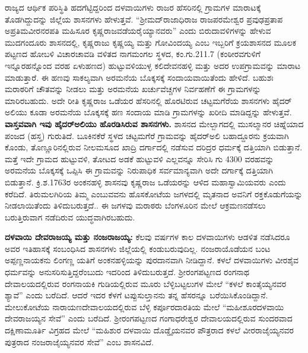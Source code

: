 ರಾಜ್ಯದ ಆರ್ಥಿಕ ಪರಿಸ್ಥಿತಿ ಹದಗೆಟ್ಟಿದ್ದರಿಂದ ದಳವಾಯಿಗಳು ರಾಜರ ಹೆಸರಿನಲ್ಲಿ ಗ್ರಾಮಗಳ ಮಾರಾಟಕ್ಕೆ ತೊಡಗಿದ್ದುದನ್ನು ಜಿಲ್ಲೆಯ ಶಾಸನಗಳು ಹೇಳುತ್ತವೆ. “ಶ‍್ರೀಮದ್​ರಾಜಾಧಿರಾಜ ರಾಜಪರಮೇಶ್ವರ ಪ್ರವುಢಪ್ರತಾಪ ಅಪ್ರತಿಮವೀರನರಪತಿ ಮಹಿಸೂರ ಕೃಷ್ಣರಾಜವಡೆಯರೈಯ್ಯಾನವರು” ಎಂದು ಬಿರುದಾವಳಿಗಳನ್ನು ಹೇಳುವ ಮುದಗಂದೂರು ಶಾಸನದಲ್ಲಿ, ಕೃಷ್ಣರಾಜು ಕೃಷ್ಣಯ್ಯ ಮತ್ತು ಗೋವಿಂದಯ್ಯ ಎಂಬ ಇಬ್ಬರಿಗೆ ಕ್ರಯಶಾಸನದ ಮೂಲಕ ಪಟ್ಟಣದ ಹೋಬಳಿ ವಿಚಾರಚಾವಡಿ ವಳಿತದ ನಾಗಮಂಗಲ ಸ್ಥಳದ, ಕಂ.ಗು.211.7 (ಕಂಠೀರವಗುಳಿಗೆ ಇನ್ನೂರಹನ್ನೊಂದ ವರಹ ಏಳುಹಣದ) ಹುಟ್ಟುವಳಿಯುಳ್ಳ ಕಲಿದೇವನಹಳ್ಳಿ ಮತ್ತು ಅದರ ಉಪಗ್ರಾಮವನ್ನು ಮಾರಾಟ ಮಾಡುತ್ತಾರೆ. ಈ ಹಣವು ಸಾಕಲ್ಯವಾಗಿ ಅರಮನೆಯ ಬೊಕ್ಕಸಕ್ಕೆ ಸಂದಾಯವಾಯಿತೆಂದು ಹೇಳಿದೆ. ಬಹುಶಃ ಮರಾಠರಿಗೆ ಚೌತವನ್ನು ನೀಡಲು ಮತ್ತು ಅರಮನೆಯ ಖರ್ಚುವೆಚ್ಚಗಳ ನಿರ್ವಹಣೆಗೆ ಈ ಗ್ರಾಮಗಳನ್ನು ಮಾರಿರಬಹುದು. ಅದೇ ರೀತಿ ಕೃಷ್ಣರಾಜ ಒಡೆಯರ ಹೆಸರಿನಲ್ಲಿ ಹೊರಟಿರುವ ಚಟ್ಟಮಗೆರೆಯ ಶಾಸನಗಳು ಹೈದರ್​ಅಲಿಯು ಕೂಡಾ ಅರಮನೆಯ ಬೊಕ್ಕಸಕ್ಕೆ ಹಣ ಸಂದಾಯ ಮಾಡಿ ಗ್ರಾಮಗಳನ್ನು ಖರೀದಿ ಮಾಡಿದ್ದನ್ನು ಹೇಳುತ್ತವೆ. \textbf{ವಾಸ್ತವವಾಗಿ ಇವು ಹೈದರ್​ಅಲಿಯು ಹೊರಡಿಸಿರುವ ಶಾಸನಗಳು.} ಶಾಸನದ ಮೇಲ್ಬಾಗದಲ್ಲಿ ಮುಸಲ್ಮಾನರ ಚಿಹ್ನೆಯಾದ ಪಂಜದ (ಹಸ್ತ) ಗುರುತಿದೆ. ಬೂಕಿನಕೆರೆ ಸ್ಥಳದ ಚಟ್ಟಮಗೆರೆ ಗ್ರಾಮವನ್ನು ಹೈದರ್​ಅಲಿ ಬಹಾದ್ದೂರನು ಕ್ರಯವಾಗಿ ಕೊಂಡು, ತೊಣ್ಣೂರಿನಲ್ಲಿರುವ ನೀಲಮಸೂದ ಖಾದ್ರಿ ದರ್ಗಾದಲ್ಲಿ ನಡೆಸುವ ದರಿದ್ರರ ಧರ್ಮಕ್ಕೆ ದತ್ತಿಯಾಗಿ ಬಿಡುತ್ತಾನೆ. ಮತ್ತೆ ಇದೇ ಗ್ರಾಮದ ಹುಟ್ಟುವಳಿ, ತೋಟದ ಅಡಕೆ ಹುಟ್ಟುವಳಿ ಎಲ್ಲವನ್ನೂ ಸೇರಿಸಿ ಗು 4300 ವರಹವನ್ನು ಅರಮನೆಯ ಬೊಕ್ಕಸಕ್ಕೆ ಒಪ್ಪಿಸಿ ಈ ಗ್ರಾಮವನ್ನು ನಿರುಪಾಧಿಕ ಸರ್ವಮಾನ್ಯವಾಗಿ ಅದೇ ದರ್ಗಾಕ್ಕೆ ದತ್ತಿಯಾಗಿ ಬಿಡುತ್ತಾನೆ. ಕ್ರಿ.ಶ.1763ರ ಅಂಕನಹಳ್ಳಿ ಶಾಸನವು ಕೃಷ್ಣರಾಜ ಒಡೆಯರನ್ನು ಆಳಿದ ಮಹಾಸ್ವಾಮಿಯವರು ಎಂದು ಕರೆದಿದೆ. ತಿರುಮಲಗಿರಿಯ ತಿಮ್ಮ ಎಂಬುವವನು ಹೊಸಕೋಟೆಯ ಜಗಳದಲ್ಲಿ ಮೃತನಾದ ಅವನಿಗೆ ರಕ್ತಕೊಡುಗೆಯನ್ನು ನೀಡಲಾಯಿತೆಂದು ತಿಳಿದುಬರುತ್ತದೆ.. ಈ ಜಗಳವು ಮರಾಠರು ಬೆಂಗಳೂರಿನ ಮೇಲೆ ಆಕ್ರಮಣನಡೆಸಲು ಬರುತ್ತಿರುವಾಗ ನಡೆದಿರುವ ಯುದ್ಧವಾಗಿರಬಹುದು.

\textbf{ ದಳವಾಯಿ ದೇವರಾಜಯ್ಯ ಮತ್ತು ನಂಜರಾಜಯ್ಯ: } ಕೆಲವು ವರ್ಷಗಳ ಕಾಲ ದಳವಾಯಿಗಳು ಆಡಳಿತ ನಡೆಸಿದರೂ ಅವರ ಇತಿಹಾಸಕ್ಕೆ ಸಂಬಂಧಿಸಿದ ಶಾಸನಗಳು ಜಿಲ್ಲೆಯಲ್ಲಿ ಕಂಡುಬರುವುದಿಲ್ಲ. ನಂಜರಾಯೊಡೆಯನ ಬಂಟ ಅಪ್ಪಣ್ಣನಾಯಕನು ಲಿಂಗಣ್ಣ ಯತಿಗೆ ಅಂಕನಹಳ್ಳಿಯನ್ನು ಪುರದಾನವಾಗಿ ನೀಡಿದ್ದಾನೆ. ಕಳಲೆ ದಳವಾಯಿಗಳು ವೀರಶೈವ ಧರ್ಮವನ್ನು ಅನುಸರಿಸುತ್ತಿದ್ದರೆಂಬುದು ಇದರಿಂದ ತಿಳಿದುಬರುತ್ತದೆ. ಶ‍್ರೀರಂಗಪಟ್ಟಣದ ರಂಗನಾಥ ದೇವಾಲಯದಲ್ಲಿರುವ ರಂಗನಾಯಕಿ ಗುಡಿಯಲ್ಲಿರುವ ಮೂರು ಬೆಳ್ಳಿಬಟ್ಟಲುಗಳ ಮೇಲೆ “ಕಳಲೆ ಕಾಂತೈಯ್ಯನವರ ಶ್ಯಾವೆ” ಎಂದು ಬರೆದಿದೆ. ಆದರೆ ಇದರ ಕೆಳಗೆ ಟಪ್ಪುಸುಲ್ತಾನನು ತನ್ನ ಹೆಸರನ್ನೂ ಬರೆಯಿಸಿಕೊಂಡಿದ್ದಾನೆ. ಮೇಲುಕೋಟೆಯ ನಾರಾಯಣದೇವಾಲಯದಲ್ಲಿರುವ ಬೆಳ್ಳಿ ಕರ್ಪೂರದಾರತಿಯ ಮೇಲೆ “ಮಹೀಶೂರದಳವಾಯಿ ದೇವರಾಜಯ್ಯನ ಸೇವೆ” ಎಂದು ಬರೆದಿದೆ. ಶ‍್ರೀರಂಗಪಟ್ಟಣದ ಗಂಗಾಧರೇಶ್ವರ ದೇವಾಲಯದಲ್ಲಿರುವ ಸುಂದರವಾದ ದಕ್ಷಿಣಾಮೂರ್ತಿ ವಿಗ್ರಹದ ಮೇಲೆ “ಮಹಿಶುರ ದಳವಾಯಿ ದೊಡ್ಡೈಯ\-ನವರ ಪೌತ್ರರಾದ ಕಳಲೆ ವೀರರಾಜೈಯ್ಯನವರ ಪುತ್ರರಾದ ನಂಜರಾಜೈಯ್ಯನವರ ಸೇವೆ” ಎಂಬ ಶಾಸನವಿದೆ.

